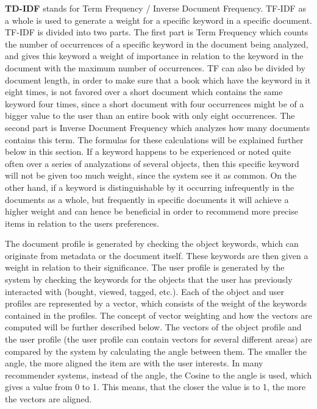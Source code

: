 \textbf{TD-IDF} stands for Term Frequency / Inverse Document Frequency. TF-IDF as a whole is used to generate a weight for a specific keyword in a specific document. TF-IDF is divided into two parts.\newline 
The first part is Term Frequency which counts the number of occurrences of a specific keyword in the document being analyzed, and gives this keyword a weight of importance in relation to the keyword in the document with the maximum number of occurrences. TF can also be divided by document length, in order to make sure that a book which have the keyword in it eight times, is not favored over a short document which contains the same keyword four times, since a short document with four occurrences might be of a bigger value to the user than an entire book with only eight occurrences. 
The second part is Inverse Document Frequency which analyzes how many documents contains this term. The formulas for these calculations will be explained further below in this section. \newline
If a keyword happens to be experienced or noted quite often over a series of analyzations of several objects, then this specific keyword will not be given too much weight, since the system see it as common. On the other hand, if a keyword is distinguishable by it occurring infrequently in the documents as a whole, but frequently in specific documents it will achieve a higher weight and can hence be beneficial in order to recommend more precise items in relation to the users preferences.\newline

The document profile is generated by checking the object keywords, which can originate from metadata or the document itself. These keywords are then given a weight in relation to their significance.
The user profile is generated by the system by checking the keywords for the objects that the user has previously interacted with (bought, viewed, tagged, etc.). Each of the object and user profiles are represented by a vector, which consists of the weight of the keywords contained in the profiles. The concept of vector weighting and how the vectors are computed will be further described below.
The vectors of the object profile and the user profile (the user profile can contain vectors for several different areas) are compared by the system by calculating the angle between them. The smaller the angle, the more aligned the item are with the user interests. In many recommender systems, instead of the angle, the Cosine to the angle is used, which gives a value from 0 to 1. This means, that the closer the value is to 1, the more the vectors are aligned.\newline

